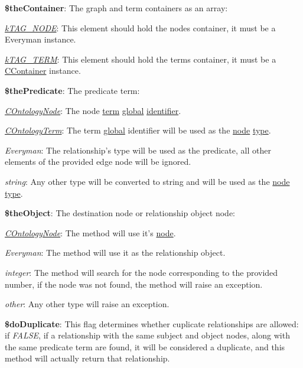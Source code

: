 \begin{DoxyItemize}
\item {\bfseries \$the\-Container}\-: The graph and term containers as an array\-: 
\begin{DoxyItemize}
\item {\itshape \hyperlink{}{k\-T\-A\-G\-\_\-\-N\-O\-D\-E}}\-: This element should hold the nodes container, it must be a Everyman instance. 
\item {\itshape \hyperlink{}{k\-T\-A\-G\-\_\-\-T\-E\-R\-M}}\-: This element should hold the terms container, it must be a \hyperlink{class_c_container}{C\-Container} instance. 
\end{DoxyItemize}
\item {\bfseries \$the\-Predicate}\-: The predicate term\-: 
\begin{DoxyItemize}
\item {\itshape \hyperlink{class_c_ontology_node}{C\-Ontology\-Node}}\-: The node \hyperlink{class_c_ontology_node_a2f294a9c93079f58190cedbdd0c09068}{term} \hyperlink{}{global} \hyperlink{class_c_ontology_term_object_ab1a4d21bb56a8a6cf3f77f595d776267}{identifier}. 
\item {\itshape \hyperlink{class_c_ontology_term}{C\-Ontology\-Term}}\-: The term \hyperlink{}{global} identifier will be used as the \hyperlink{class_c_ontology_edge}{node} \hyperlink{class_c_graph_edge_a584c0263fd773ffb764385a51d36caf2}{type}. 
\item {\itshape Everyman}\-: The relationship's type will be used as the predicate, all other elements of the provided edge node will be ignored. 
\item {\itshape string}\-: Any other type will be converted to string and will be used as the \hyperlink{class_c_ontology_edge}{node} \hyperlink{class_c_graph_edge_a584c0263fd773ffb764385a51d36caf2}{type}. 
\end{DoxyItemize}
\item {\bfseries \$the\-Object}\-: The destination node or relationship object node\-: 
\begin{DoxyItemize}
\item {\itshape \hyperlink{class_c_ontology_node}{C\-Ontology\-Node}}\-: The method will use it's \hyperlink{class_c_graph_node_ad830025d2d6650006eb6e737bd4f32c0}{node}. 
\item {\itshape Everyman}\-: The method will use it as the relationship object. 
\item {\itshape integer}\-: The method will search for the node corresponding to the provided number, if the node was not found, the method will raise an exception. 
\item {\itshape other}\-: Any other type will raise an exception. 
\end{DoxyItemize}
\item {\bfseries \$do\-Duplicate}\-: This flag determines whether cuplicate relationships are allowed\-: if {\itshape F\-A\-L\-S\-E}, if a relationship with the same subject and object nodes, along with the same predicate term are found, it will be considered a duplicate, and this method will actually return that relationship. 
\end{DoxyItemize}

